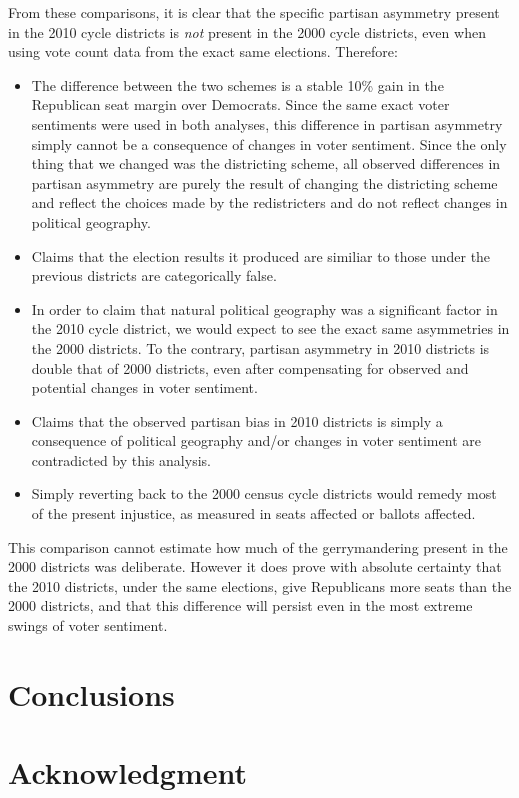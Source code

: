 \documentclass[preprint,12pt]{article}
\begin{document}
From these comparisons, it is clear that the specific partisan asymmetry present in the 2010 cycle districts is \emph{not} present in the 2000 cycle districts, even when using vote count data from the exact same elections.  Therefore:
\begin{itemize}

\item The difference between the two schemes is a stable 10\% gain in the Republican seat margin over Democrats.
Since the same exact voter sentiments were used in both analyses, this difference in partisan asymmetry simply cannot be a consequence of changes in voter sentiment.  
Since the only thing that we changed was the districting scheme, all observed differences in partisan asymmetry are purely the result of changing the districting scheme and reflect the choices made by the redistricters and do not reflect changes in political geography.
\item Claims that the election results it produced are similiar to those under the previous districts are categorically false.
\item In order to claim that natural political geography was a significant factor in the 2010 cycle district, we would expect to see the exact same asymmetries in the 2000 districts.
To the contrary, partisan asymmetry in 2010 districts is double that of 2000 districts, even after compensating for observed and potential changes in voter sentiment.
\item Claims that the observed partisan bias in 2010 districts is simply a consequence of political geography and/or changes in voter sentiment are contradicted by this analysis.
\item Simply reverting back to the 2000 census cycle districts would remedy most of the present injustice, as measured in seats affected or ballots affected.
\end{itemize}

This comparison cannot estimate how much of the gerrymandering present in the 2000 districts was deliberate.
However it does prove with absolute certainty that the 2010 districts, under the same elections, give Republicans more seats than the 2000 districts, and that this difference will persist even in the most extreme swings of voter sentiment.

\section{Conclusions}

\clearpage
\section*{Acknowledgment}
\section*{}


\clearpage
\end{document}
